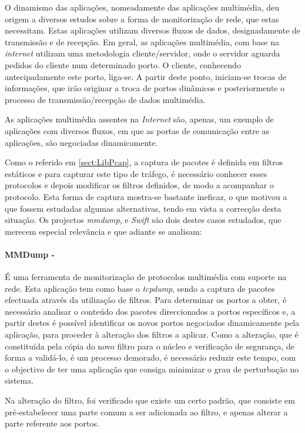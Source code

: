 O dinamismo das aplicações, nomeadamente das aplicações multimédia, deu origem a diversos estudos sobre a forma de monitorização de rede, que estas necessitam.
Estas aplicações utilizam diversos fluxos de dados, designadamente de transmissão e de recepção.
Em geral, as aplicações multimédia, com base na \textit{internet} utilizam uma metodologia cliente/servidor, onde o servidor aguarda pedidos do cliente num determinado porto.
O cliente, conhecendo antecipadamente este porto, liga-se.
A partir deste ponto, iniciam-se trocas de informações, que irão originar a troca de portos dinâmicos e posteriormente o processo de transmissão/recepção de dados multimédia.

As aplicações multimédia assentes na \textit{Internet} são, apenas, um exemplo de aplicações com diversos fluxos, em que as portas de comunicação entre as aplicações, são negociadas dinamicamente.

Como o referido em \ref{sect:LibPcap}, a captura de pacotes é definida em filtros estáticos e para capturar este tipo de tráfego, é necessário conhecer esses protocolos e depois modificar os filtros definidos, de modo a acompanhar o protocolo.
Esta forma de captura mostra-se bastante ineficaz, o que motivou a que fossem estudadas algumas alternativas, tendo em vista a correcção desta situação.
Os projectos \textit{mmdump}\cite{505678}, %
e \textit{Swift}\cite{1387609} são dois destes casos estudados, que merecem especial relevância e que adiante se analisam:

\paragraph*{MMDump - } É uma ferramenta de monitorização de protocolos multimédia com suporte na rede.
Esta aplicação tem como base o \textit{tcpdump}, sendo a captura de pacotes efectuada através da utilização de filtros.
Para determinar os portos a obter, é necessário analisar o conteúdo dos pacotes direccionados a portos específicos e, a partir destes é possível identificar os novos portos negociados dinamicamente pela aplicação, para proceder à alteração dos filtros a aplicar.
Como a alteração, que é constituída pela cópia do novo filtro para o núcleo e verificação de segurança, de forma a validá-lo, é um processo demorado, é necessário reduzir este tempo, com o objectivo de ter uma aplicação que consiga minimizar o grau de perturbação no sistema.

Na alteração do filtro, foi verificado que existe um certo padrão, que consiste em pré-estabelecer uma parte comum a ser adicionada ao filtro, e apenas alterar a parte referente aos portos.

